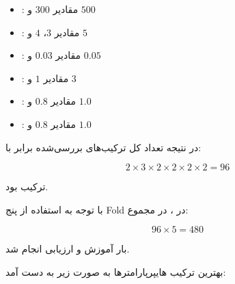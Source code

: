 \documentclass[10pt,a4paper,twocolumn]{article}
\begin{document}
\begin{itemize}

    \item {}: مقادیر $300$ و $500$

    \item {}: مقادیر $3$، $4$ و $5$

    \item {}: مقادیر $0.03$ و $0.05$

    \item {}: مقادیر $1$ و $3$

    \item {}: مقادیر $0.8$ و $1.0$

    \item {}: مقادیر $0.8$ و $1.0$

\end{itemize}

در نتیجه تعداد کل ترکیب‌های بررسی‌شده برابر با:

\[
2 \times 3 \times 2 \times 2 \times 2 \times 2
=
96
\]

ترکیب بود.

با توجه به استفاده از پنج Fold در
، در مجموع:

\[
96 \times 5 = 480
\]

بار آموزش و ارزیابی انجام شد.

بهترین ترکیب هایپرپارامترها به صورت زیر به دست آمد:
\end{document}
